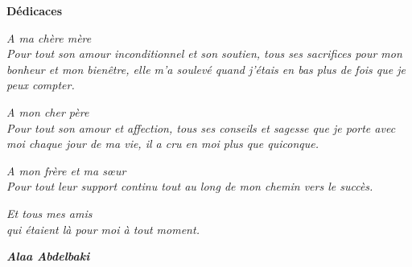 \thispagestyle{empty}
\setmainfont{QTLinostroke}

\normalfont
\begin{center}
    \begin{huge}
        \textbf{Dédicaces}
    \end{huge}
\end{center}
\vspace{2cm}
\centering
\begin{large}
    \textit{A ma chère mère\\
        \noindent Pour tout son amour inconditionnel et son soutien, tous ses sacrifices pour mon bonheur et mon bienêtre, elle m'a soulevé quand j'étais en bas plus de fois que je peux compter.}


    \textit{A mon cher père\\
        \noindent Pour tout son amour et affection, tous ses conseils et sagesse que je porte avec moi chaque jour de ma vie, il a cru en moi plus que quiconque.}


    \textit{A mon frère et ma sœur\\
        \noindent Pour tout leur support continu tout au long de mon chemin vers le succès.}


    \textit{Et tous mes amis\\
        \noindent qui étaient là pour moi à tout moment.}


    \bigbreak
    \begin{flushright}
        \textbf{\textit{Alaa Abdelbaki}}
    \end{flushright}
\end{large}
\raggedright
